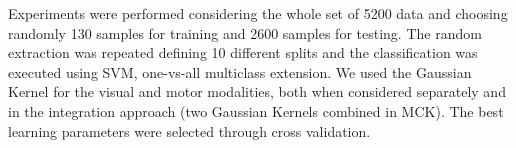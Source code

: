 Experiments were performed considering the whole set
of 5200 data and choosing randomly 130 samples for
training and 2600 samples for testing. The random extraction was repeated
defining 10 different splits and the classification was executed using SVM,
one-vs-all multiclass extension. We used the Gaussian Kernel for the
visual and motor modalities, both when considered separately and in the
integration approach (two Gaussian Kernels combined in MCK). The best
learning parameters were selected through cross validation.


